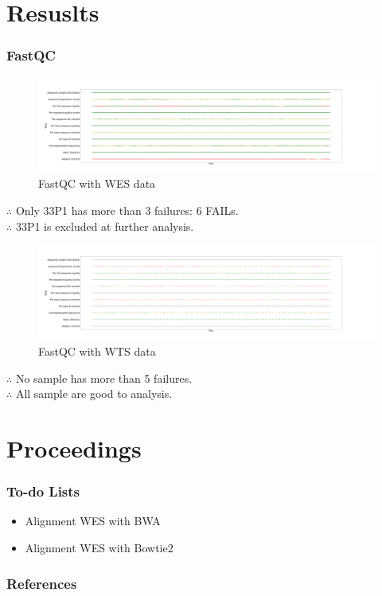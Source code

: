 \documentclass{beamer}
\begin{document}
    \section{Resuslts}
    \begin{frame}[allowframebreaks]
        \frametitle{FastQC}

        \begin{figure}
            \includegraphics[width=0.8 \linewidth]{figures/FastQC/FastQC_WES.png}
            \caption{FastQC with WES data}
        \end{figure}

        $\therefore$ Only 33P1 has more than 3 failures: 6 FAILs. \\
        $\therefore$ 33P1 is excluded at further analysis.

        \begin{figure}
            \includegraphics[width=0.8 \linewidth]{figures/FastQC/FastQC_WTS.png}
            \caption{FastQC with WTS data}
        \end{figure}

        $\therefore$ No sample has more than 5 failures. \\
        $\therefore$ All sample are good to analysis.
    \end{frame}

    \section{Proceedings}
    \begin{frame}[allowframebreaks]
        \frametitle{To-do Lists}

        \begin{itemize}
            \item Alignment WES with BWA
            \item Alignment WES with Bowtie2
        \end{itemize}
    \end{frame}

    \begin{frame}[allowframebreaks]
        \frametitle{References}
        
        
    \end{frame}
\end{document}
